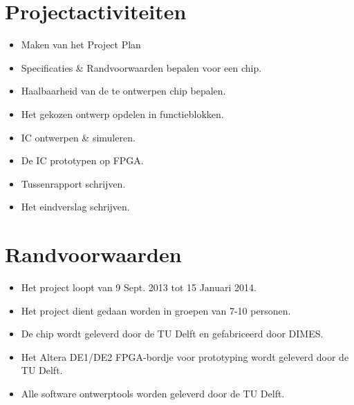 \documentclass{article}
\begin{document}
\section{Projectactiviteiten}
\begin{itemize}
\item Maken van het Project Plan
\item Specificaties \&  Randvoorwaarden bepalen voor een chip.
\item Haalbaarheid van de te ontwerpen chip bepalen.
\item Het gekozen ontwerp opdelen in functieblokken.
\item IC ontwerpen \& simuleren.
\item De IC prototypen op FPGA.
\item Tussenrapport schrijven.
\item Het eindverslag schrijven.
\end{itemize}

\section{Randvoorwaarden}
\begin{itemize}
\item Het project loopt van 9 Sept. 2013 tot 15 Januari 2014. 
\item Het project dient gedaan worden in groepen van 7-10 personen.
\item De chip wordt geleverd door de TU Delft en gefabriceerd door DIMES.
\item Het Altera DE1/DE2 FPGA-bordje voor prototyping wordt geleverd door de TU Delft.
\item Alle software ontwerptools worden geleverd door de TU Delft.
\end{itemize}

%
\end{document}
